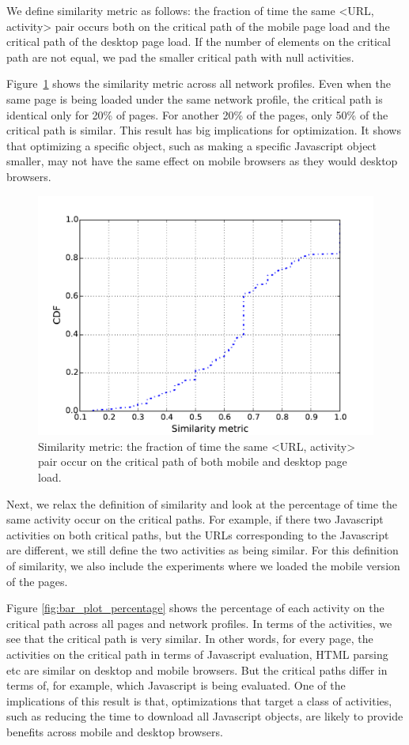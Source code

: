 \noindent We define similarity metric as follows: the fraction of time the same <URL, activity> pair occurs  both on the critical path of the mobile page load and the critical path of the desktop page load. If the number of elements on the critical path are not equal, we pad the smaller critical path with null activities.

\noindent Figure~\ref{fig:similarity} shows the similarity metric across all network profiles. Even when the same page is being loaded under the same network profile, the critical path is identical only for 20\% of pages. For another 20\% of the pages, only 50\% of the critical path is similar. This result has big implications for optimization. It shows that optimizing a specific object, such as making a specific Javascript object smaller, may not have the same effect on mobile browsers as they would desktop browsers.

\begin{figure}[!htb]
  \centering
    \includegraphics[width=0.5 \textwidth]{./figures/criticalpath/similarity.pdf}
  \caption{Similarity metric: the fraction of time the same <URL, activity> pair occur on the critical path of both mobile and desktop page load. }
  \label{fig:similarity}
\end{figure}

\noindent Next, we relax the definition of similarity and look at the percentage of time the same activity occur on the critical paths. For example, if there two Javascript activities on both critical paths, but the URLs corresponding to the Javascript are different, we still define the two activities as being similar.  For this definition of similarity, we also include the experiments where we loaded the mobile version of the pages.

\noindent Figure \ref{fig:bar_plot_percentage} shows the percentage of each activity on the critical path across all pages and network profiles. In terms of the activities, we see that the critical path is very similar. In other words, for every page, the activities on the critical path in terms of Javascript evaluation, HTML parsing etc are similar on desktop and mobile browsers. But the critical paths differ in terms of, for example, which Javascript is being evaluated. One of the implications of this result is that, optimizations that target a class of activities, such as reducing the time to download all Javascript objects, are likely to provide benefits across mobile and desktop browsers.

